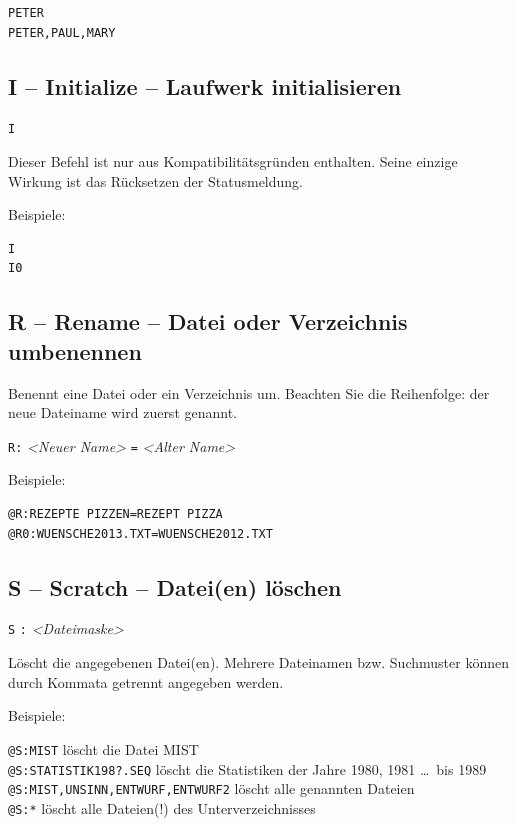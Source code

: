 \documentclass[10pt,a4paper]{scrartcl}		%
\begin{document}
\begin{verbatim}
PETER
PETER,PAUL,MARY
\end{verbatim}

\subsection{I -- Initialize -- Laufwerk initialisieren}

\texttt{I} 

Dieser Befehl ist nur aus Kompatibilitätsgründen enthalten.
Seine einzige Wirkung ist das Rücksetzen der Statusmeldung.

Beispiele:
\begin{verbatim}
I
I0
\end{verbatim}

\subsection{R -- Rename -- Datei oder Verzeichnis umbenennen}
Benennt eine Datei oder ein Verzeichnis um. Beachten Sie die Reihenfolge:
der neue Dateiname wird zuerst genannt.

\texttt{R} \texttt{:}
\textit{<Neuer Name>} \texttt{=} \textit{<Alter Name>}

Beispiele:
\begin{verbatim}
@R:REZEPTE PIZZEN=REZEPT PIZZA
@R0:WUENSCHE2013.TXT=WUENSCHE2012.TXT
\end{verbatim}

\subsection{S -- Scratch -- Datei(en) löschen}
\texttt{S}  \texttt{:}
\textit{<Dateimaske>} \Big[ \texttt{,} \ldots \  \Big]

Löscht die angegebenen Datei(en). Mehrere Dateinamen bzw. Suchmuster
können durch Kommata getrennt angegeben werden.

Beispiele:

\texttt{@S:MIST} löscht die Datei MIST\\
\texttt{@S:STATISTIK198?.SEQ} löscht die Statistiken der Jahre 1980, 1981 
\ldots \ bis 1989 \\
\texttt{@S:MIST,UNSINN,ENTWURF,ENTWURF2} löscht alle genannten Dateien \\
\texttt{@S:*} löscht alle Dateien(!) des Unterverzeichnisses
\end{document}
